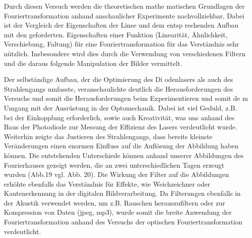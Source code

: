 


Durch    diesen    Versuch    werden    die    theoretischen    mathe
matischen    Grundlagen    der Fouriertransformation  anhand  anschaulicher  Experimente   nachvollziehbar.  Dabei   ist   der 
Vergleich  der  Eigenschaften  der Linse  und  dem  entsp
rechenden  Aufbau  mit  den  geforderten. Eigenschaften   einer   Funktion   (Linearität,   Ähnlichkeit,   Verschiebung,   Faltung)   für   eine Fouriertransformation  für  das  Verständnis  sehr  nützlich.  Insbesondere  wird  dies  durch  die Verwendung  von  verschiedenen  Filtern  und  die  daraus folgende  Manipulation  der  Bilder vermittelt.  

Der  selbständige  Aufbau,  der  die  Optimierung  des  Di
odenlasers  als  auch  des  Strahlengangs umfasste,  veranschaulichte  deutlich  die  Herausforderungen  des  Versuchs  und  somit  die Herausforderungen beim Experimentieren  und somit de
m Umgang mit der Ausrüstung in der Optomechanik.  Dabei  ist  viel  Geduld,  z.B.  bei  der  Einkopplung  erforderlich,  sowie  auch 
Kreativität,  was  uns  anhand  des  Baus  der  Photodiode
zur  Messung  der  Effizienz  des  Lasers verdeutlicht  wurde.  Weiterhin  zeigte  das  Justieren des  Strahlengangs,  dass  bereits  kleinste Veränderungen  einen  enormen  Einfluss auf  die  Auflösung  der  Abbildung  haben  können. Die entstehenden  Unterschiede  können  anhand  unserer  Abbildungen  des  Fourierhauses  gezeigt werden, die an zwei unterschiedlichen Tagen erzeugt wurden (Abb.19 vgl. Abb. 20). Die  Wirkung  der  Filter  auf  die  Abbildungen  erhöhte ebenfalls  das  Verständnis  für  Effekte, wie  Weichzeichner  oder  Kantenerkennung  in  der  digitalen  Bildverarbeitung.  Da  Filterungen ebenfalls  in  der  Akustik  verwendet  werden,  um  z.B. Rauschen  herauszufiltern  oder  zur Kompression  von  Daten (jpeg,  mp3), wurde somit die breite  Anwendung der Fouriertransformation anhand des Versuchs der optischen Fouriertransformation verdeutlicht.  




